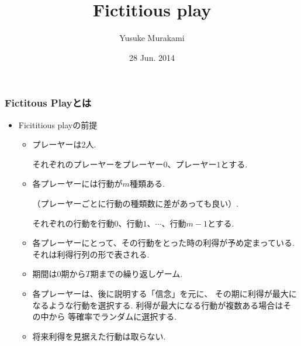 \documentclass[dvipdfmx,fleqn]{beamer}
\title{\Large Fictitious play}
\author{\large Yusuke Murakami}
\date{\small 28 Jun. 2014}
\begin{document}
\sffamily
\gtfamily


\begin{frame}
  \titlepage
  \thispagestyle{empty}
\end{frame}

\setcounter{framenumber}{0}

\begin{frame}
\frametitle{Fictitous Playとは}
\begin{itemize}\setlength{\parskip}{0.5em}
\item
Ficititious playの前提

	\begin{itemize}\setlength{\parskip}{0.5em}
 	\item
	プレーヤーは$2$人.
	
	それぞれのプレーヤーをプレーヤー$0$、プレーヤー$1$とする.
	
	\item
	各プレーヤーには行動が$m$種類ある.
	
	（プレーヤーごとに行動の種類数に差があっても良い）.
	
	それぞれの行動を行動$0$、行動$1$、$\cdots$、行動$m-1$とする.
	
	\item
	各プレーヤーにとって、その行動をとった時の利得が予め定まっている.
	それは利得行列の形で表される.
	
	\item
	期間は$0$期から$T$期までの繰り返しゲーム.
	
	\item
	各プレーヤーは、後に説明する「信念」を元に、
	その期に利得が最大になるような行動を選択する.
	利得が最大になる行動が複数ある場合はその中から
	等確率でランダムに選択する.
	
	\item
	将来利得を見据えた行動は取らない.
	
	\end{itemize}

\end{itemize}
\end{frame}
\end{document}

